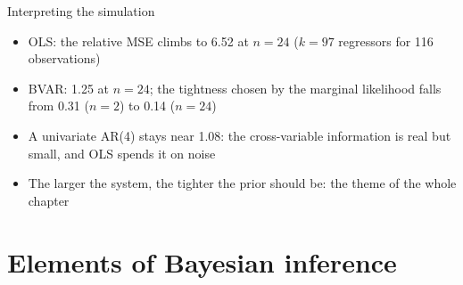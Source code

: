 \begin{frame}{Interpreting the simulation}
\itemsize{\small}
\begin{itemize}
    \item OLS: the relative MSE climbs to 6.52 at $n = 24$ ($k = 97$ regressors for 116 observations)
    \item BVAR: 1.25 at $n = 24$; the tightness chosen by the marginal likelihood falls from 0.31 ($n = 2$) to 0.14 ($n = 24$)
    \item A univariate AR(4) stays near 1.08: the cross-variable information is real but small, and OLS spends it on noise
    \item The larger the system, the tighter the prior should be: the theme of the whole chapter 
\end{itemize}
\end{frame}


\section{Elements of Bayesian inference}

